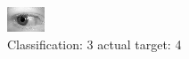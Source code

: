 \begin{figure}[h!]
\begin{center}
\includegraphics[width=0.60\columnwidth]{figures/ID730_class_3_target_4.png}
\end{center}
\caption{ Classification: 3 actual target: 4}
\label{fig:ID730_class_3_target_4}
\end{figure}

